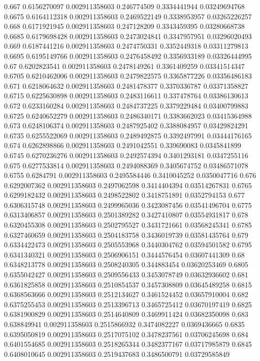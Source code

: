 {0.667 0.6156270097 0.002911358603 0.246774509 0.3334441944 0.03249694768
0.6675 0.6164112318 0.002911358603 0.2469522149 0.3338953957 0.03265226257
0.668 0.6171921945 0.002911358603 0.247128209 0.3343459395 0.03280668738
0.6685 0.6179698428 0.002911358603 0.2473024841 0.3347957951 0.03296020493
0.669 0.6187441216 0.002911358603 0.2474750331 0.3352449318 0.03311279813
0.6695 0.6195149766 0.002911358603 0.2476458492 0.3356933189 0.03326444995
0.67 0.6202823541 0.002911358603 0.2478149261 0.3361409259 0.03341514347
0.6705 0.6210462006 0.002911358603 0.2479822575 0.3365877226 0.03356486183
0.671 0.6218064632 0.002911358603 0.2481478377 0.3370336787 0.03371358827
0.6715 0.6225630898 0.002911358603 0.2483116611 0.337478764 0.03386130613
0.672 0.6233160284 0.002911358603 0.2484737225 0.3379229484 0.03400799883
0.6725 0.6240652279 0.002911358603 0.2486340171 0.3383662023 0.03415364988
0.673 0.6248106374 0.002911358603 0.2487925402 0.3388084957 0.03429824291
0.6735 0.6255522069 0.002911358603 0.2489492875 0.3392497991 0.03444176165
0.674 0.6262898866 0.002911358603 0.2491042551 0.339690083 0.0345841899
0.6745 0.6270236276 0.002911358603 0.2492574394 0.3401293181 0.0347255116
0.675 0.6277533814 0.002911358603 0.2494088369 0.3405674752 0.03486571078
0.6755 0.6284791 0.002911358603 0.2495584446 0.3410045252 0.0350047716
0.676 0.6292007362 0.002911358603 0.2497062598 0.3414404394 0.03514267831
0.6765 0.6299182432 0.002911358603 0.2498522802 0.3418751891 0.0352794153
0.677 0.6306315748 0.002911358603 0.2499965036 0.3423087456 0.03541496704
0.6775 0.6313406857 0.002911358603 0.2501389282 0.3427410807 0.03554931817
0.678 0.6320455308 0.002911358603 0.2502795527 0.3431721661 0.03568245341
0.6785 0.6327460659 0.002911358603 0.2504183758 0.3436019739 0.03581435764
0.679 0.6334422473 0.002911358603 0.2505553968 0.3440304762 0.03594501582
0.6795 0.6341340321 0.002911358603 0.2506906151 0.3444576454 0.03607441309
0.68 0.6348213778 0.002911358603 0.2508240305 0.344883454 0.03620253469
0.6805 0.6355042427 0.002911358603 0.2509556433 0.3453078749 0.03632936602
0.681 0.6361825858 0.002911358603 0.2510854537 0.3457308809 0.03645489258
0.6815 0.6368563666 0.002911358603 0.2512134627 0.3461524452 0.03657910004
0.682 0.6375255453 0.002911358603 0.2513396713 0.3465725412 0.03670197419
0.6825 0.6381900829 0.002911358603 0.2514640809 0.3469911424 0.03682350098
0.683 0.638849941 0.002911358603 0.2515866932 0.3474082227 0.0369436665
0.6835 0.6395050819 0.002911358603 0.2517075102 0.3478237561 0.03706245698
0.684 0.6401554685 0.002911358603 0.2518265344 0.3482377167 0.03717985879
0.6845 0.6408010645 0.002911358603 0.2519437683 0.3486500791 0.03729585849
}
